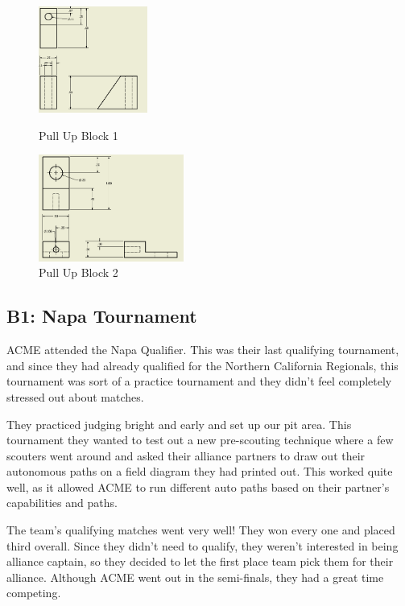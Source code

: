 \documentclass{article}
\begin{document}
\begin{figure}[h!]
\begin{minipage}{.45\textwidth}
    \centering
    \includegraphics[height=3.5cm]{24_02-11/images/PullUpBlock1.PNG}
    \caption{Pull Up Block 1}
    \label{fig:PullUp1}
\end{minipage}\hfill

\begin{minipage}{.45\textwidth}
\centering
    \includegraphics[height=3.5cm]{24_02-11/images/PullUp2.PNG}
    \caption{Pull Up Block 2}
    \label{fig:PullUp2}
    \end{minipage}
\end{figure}
\subsection{B1: Napa Tournament}

ACME attended the Napa Qualifier. This was their last qualifying tournament, and since they had already qualified for the Northern California Regionals, this tournament was sort of a practice tournament and they didn't feel completely stressed out about matches. 

They practiced judging bright and early and set up our pit area. This tournament they wanted to test out a new pre-scouting technique where a few scouters went around and asked their alliance partners to draw out their autonomous paths on a field diagram they had printed out. This worked quite well, as it allowed ACME to run different auto paths based on their partner's capabilities and paths. 

The team's qualifying matches went very well! They won every one and placed third overall. Since they didn't need to qualify, they weren't interested in being alliance captain, so they decided to let the first place team pick them for their alliance. Although ACME went out in the semi-finals, they had a great time competing. 
\end{document}

